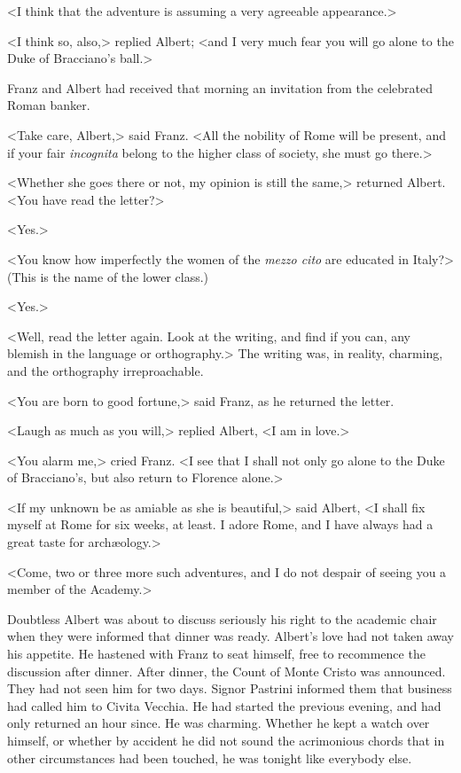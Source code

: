  <I think that the adventure is assuming a very agreeable appearance.> 

 <I think so, also,> replied Albert; <and I very much fear you will go alone to the Duke of Bracciano's ball.> 

 Franz and Albert had received that morning an invitation from the celebrated Roman banker. 

 <Take care, Albert,> said Franz. <All the nobility of Rome will be present, and if your fair \textit{incognita} belong to the higher class of society, she must go there.> 

 <Whether she goes there or not, my opinion is still the same,> returned Albert. <You have read the letter?> 

 <Yes.> 

 <You know how imperfectly the women of the \textit{mezzo cito} are educated in Italy?> (This is the name of the lower class.) 

 <Yes.> 

 <Well, read the letter again. Look at the writing, and find if you can, any blemish in the language or orthography.> The writing was, in reality, charming, and the orthography irreproachable. 

 <You are born to good fortune,> said Franz, as he returned the letter. 

 <Laugh as much as you will,> replied Albert, <I am in love.> 

 <You alarm me,> cried Franz. <I see that I shall not only go alone to the Duke of Bracciano's, but also return to Florence alone.> 

 <If my unknown be as amiable as she is beautiful,> said Albert, <I shall fix myself at Rome for six weeks, at least. I adore Rome, and I have always had a great taste for archæology.>

<Come, two or three more such adventures, and I do not despair of seeing you a member of the Academy.> 

 Doubtless Albert was about to discuss seriously his right to the academic chair when they were informed that dinner was ready. Albert's love had not taken away his appetite. He hastened with Franz to seat himself, free to recommence the discussion after dinner. After dinner, the Count of Monte Cristo was announced. They had not seen him for two days. Signor Pastrini informed them that business had called him to Civita Vecchia. He had started the previous evening, and had only returned an hour since. He was charming. Whether he kept a watch over himself, or whether by accident he did not sound the acrimonious chords that in other circumstances had been touched, he was tonight like everybody else. 

